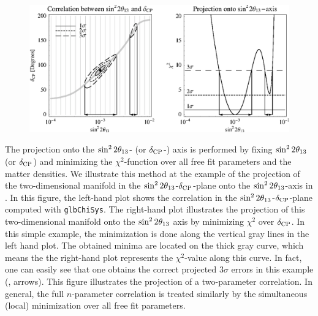 \begin{figure}[t]
\begin{center}
\includegraphics[width=16cm]{projex}
\end{center}
\end{figure}

The projection onto the $\sin^2 2 \theta_{13}$- (or $\delta_{\mathrm{CP}}$-) axis is performed by fixing $\sin^2 2 \theta_{13}$ (or $\delta_{\mathrm{CP}}$) and minimizing the $\chi^2$-function over all free fit parameters and the matter densities. We illustrate this method at the example of the projection of the two-dimensional manifold in the $\sin^2 2 \theta_{13}$-$\delta_{\mathrm{CP}}$-plane onto the $\sin^2 2 \theta_{13}$-axis in . In this figure, the left-hand plot shows the correlation in the $\sin^2 2 \theta_{13}$-$\delta_{\mathrm{CP}}$-plane computed with {\tt glbChiSys}. The right-hand plot illustrates the projection of this two-dimensional manifold onto the $\sin^2 2 \theta_{13}$ axis by minimizing $\chi^2$ over $\delta_{\mathrm{CP}}$. In this simple example, the minimization is done along the vertical gray lines in the left hand plot. The obtained minima are located on the thick gray curve, which means the the right-hand plot represents the $\chi^2$-value along this curve. In fact, one can easily see that one obtains the correct projected $3 \sigma$ errors in this example (\cf, arrows). This figure illustrates the projection of a two-parameter correlation. In general, the full $n$-parameter correlation is treated similarly by the simultaneous (local) minimization over all free fit parameters. 

